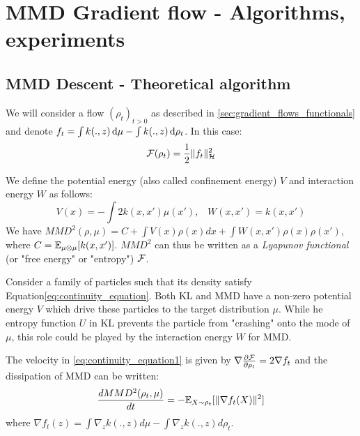 \section{MMD Gradient flow - Algorithms, experiments}\label{sec:mmd_flow}

\subsection{MMD Descent - Theoretical algorithm}

We will consider a flow $(\rho_t)_{t>0}$ as described in \cref{sec:gradient_flows_functionals} and denote $f_t= \int k(.,z)\mathop{}\!\mathrm{d} \mu - \int k(.,z)\mathop{}\!\mathrm{d} \rho_t$. In this case:
\begin{equation}
{{\mathcal F}}(\rho_t)=\frac{1}{2}\|f_t\|^2_{{{\mathcal H}}}
\end{equation} 

We define the potential energy (also called confinement energy) $V$ and interaction energy $W$ as follows:
\begin{equation}
V(x)=-\int 2 k(x,x')\mu(x')\text{,} \quad
W(x,x')=k(x,x')
\end{equation}
We have $MMD^2(\rho,\mu)=C+ \int V(x) \rho(x)dx + \int W(x,x')\rho(x)\rho(x')$, where $C={{\mathbb E}}_{\mu\otimes \mu}[k(x,x')]$. $MMD^2$ can thus be written as a \textit{Lyapunov functional} (or "free energy" or "entropy") ${{\mathcal F}}$. 

\begin{remark}
	Consider a family of particles such that its density satisfy Equation\eqref{eq:continuity_equation}. Both KL and MMD have a non-zero potential energy $V$ which drive these particles to the target distribution $\mu$. While he entropy function $U$ in KL prevents the particle from "crashing" onto the mode of $\mu$, this role could be played by the interaction energy $W$ for MMD.
\end{remark}



\begin{proposition}\label{prop:mmd_flow}
 The velocity in \eqref{eq:continuity_equation1} is given by $\nabla \frac{\partial{{{\mathcal F}}}}{\partial{\rho_t}}=2 \nabla f_t$ and the dissipation of MMD can be written:  
	\begin{equation}
	\frac{d MMD^2(\rho_t, \mu)}{dt}=-{{\mathbb E}}_{X \sim \rho_t}[\|\nabla f_t(X)\|^2]
	\end{equation}
	where $\nabla f_t(z)= \int \nabla_{z}k(.,z) d\mu -  \int \nabla_{z}k(.,z) d\rho_t$.
\end{proposition}

